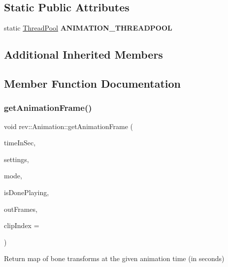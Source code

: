 \subsection*{Static Public Attributes}
\begin{DoxyCompactItemize}
\item 
\mbox{\label{classrev_1_1_animation_a4e00b80c01b68e71248f41dc3a335519}} 
static \mbox{\hyperlink{classrev_1_1_thread_pool}{Thread\+Pool}} {\bfseries A\+N\+I\+M\+A\+T\+I\+O\+N\+\_\+\+T\+H\+R\+E\+A\+D\+P\+O\+OL}
\end{DoxyCompactItemize}
\subsection*{Additional Inherited Members}


\subsection{Member Function Documentation}
\mbox{\label{classrev_1_1_animation_a11aab8f1b8487fbdb895e9855f7230e2}} 
\subsubsection{\texorpdfstring{getAnimationFrame()}{getAnimationFrame()}}
{\footnotesize\ttfamily void rev\+::\+Animation\+::get\+Animation\+Frame (\begin{DoxyParamCaption}\item[{float}]{time\+In\+Sec,  }\item[{const \mbox{\hyperlink{structrev_1_1_animation_settings}{Animation\+Settings}} \&}]{settings,  }\item[{Animation\+Playback\+Mode}]{mode,  }\item[{bool \&}]{is\+Done\+Playing,  }\item[{\mbox{\hyperlink{structrev_1_1_blend_set}{Blend\+Set}} \&}]{out\+Frames,  }\item[{uint32\+\_\+t}]{clip\+Index = {} }\end{DoxyParamCaption})}



Return map of bone transforms at the given animation time (in seconds) 


